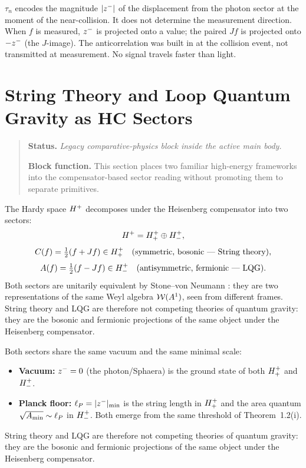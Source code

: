 \begin{remark}
$\tau_n$ encodes the magnitude $|z^-|$ of the displacement from the
photon sector at the moment of the near-collision.
It does not determine the measurement direction.
When $f$ is measured, $z^-$ is projected onto a value; the paired
$Jf$ is projected onto $-z^-$ (the $J$-image).
The anticorrelation was built in at the collision event, not transmitted
at measurement. No signal travels faster than light.
\end{remark}


\section{String Theory and Loop Quantum Gravity as HC Sectors}
\begin{quote}\small
\noindent\textbf{Status.} \emph{Legacy comparative-physics block inside the active main body.}\par
\noindent\textbf{Block function.} This section places two familiar high-energy frameworks into the compensator-based sector reading without promoting them to separate primitives.
\end{quote}
\label{sec:stringlqg}

\begin{theorem}
\label{thm:string-lqg-duality}
The Hardy space $H^+$ decomposes under the Heisenberg compensator
into two sectors:
\[
 H^+ = H^+_+\oplus H^+_-,
\]
\[
 C(f) = \tfrac{1}{2}(f+Jf)\in H^+_+
 \quad\text{(symmetric, bosonic --- String theory)},
\]
\[
 A(f) = \tfrac{1}{2}(f-Jf)\in H^+_-
 \quad\text{(antisymmetric, fermionic --- LQG)}.
\]
Both sectors are unitarily equivalent by Stone--von Neumann
\cite{brendecke2026rh}: they are two representations of the same
Weyl algebra $\mathcal{W}(A^1)$, seen from different frames.
String theory and LQG are therefore not competing theories of quantum
gravity: they are the bosonic and fermionic projections of the same
object under the Heisenberg compensator.
\end{theorem}

\begin{proposition}
\label{prop:shared-vacuum-planck}
Both sectors share the same vacuum and the same minimal scale:
\begin{itemize}
 \item \textbf{Vacuum:} $z^-=0$ (the photon/Sphaera) is the ground
 state of both $H^+_+$ and $H^+_-$.
 \item \textbf{Planck floor:} $\ell_P=|z^-|_{\min}$ is the string
 length in $H^+_+$ and the area quantum
 $\sqrt{A_{\min}}\sim\ell_P$ in $H^+_-$.
 Both emerge from the same threshold of Theorem~1.2(i).
\end{itemize}
String theory and LQG are therefore not competing theories of quantum
gravity: they are the bosonic and fermionic projections of the same
object under the Heisenberg compensator.
\end{proposition}

